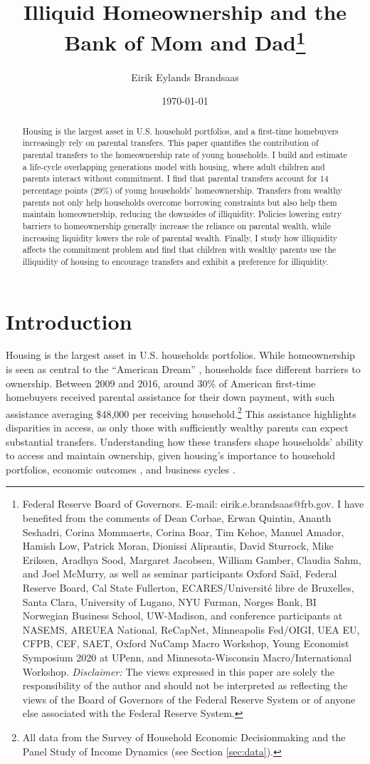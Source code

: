 \documentclass[12pt]{article}
\title{{\LARGE Illiquid Homeownership and  the \\  Bank of Mom and Dad}\thanks{Federal Reserve Board of Governors.  E-mail: eirik.e.brandsaas@frb.gov. I have benefited from the comments of Dean Corbae, Erwan Quintin, Ananth Seshadri, Corina Mommaerts,  Corina Boar, Tim Kehoe, Manuel Amador, Hamish Low, Patrick Moran, Dionissi Aliprantis, David Sturrock, Mike Eriksen, Aradhya Sood, Margaret Jacobsen, William Gamber, Claudia Sahm, and Joel McMurry, as well as seminar participants Oxford Sa{\"i}d, Federal Reserve Board, Cal State Fullerton, ECARES/Université libre de Bruxelles, Santa Clara, University of Lugano, NYU Furman, Norges Bank, BI Norwegian Business School, UW-Madison, and conference participants at NASEMS, AREUEA National, ReCapNet, Minneapolis Fed/OIGI, UEA EU, CFPB, CEF, SAET, Oxford NuCamp Macro Workshop, Young Economist Symposium 2020 at UPenn, and Minnesota-Wisconsin Macro/International Workshop. \textit{Disclaimer: }The views expressed in this paper are solely the responsibility of the author and should not be interpreted as reflecting the views of the Board of Governors of the Federal Reserve System or of anyone else associated with the Federal Reserve System.}}
\author{Eirik Eylands Brandsaas}
\date{{\today }}
\begin{document}
\maketitle
\begin{abstract}
{\begin{spacing}{1.2}
Housing is the largest asset in U.S. household portfolios, and a first-time homebuyers increasingly rely on parental transfers. This paper quantifies the contribution of parental transfers to the homeownership rate of young households. I build and estimate a life-cycle overlapping generations model with housing, where adult children and parents interact without commitment. I find that parental transfers account for 14 percentage points (29\%) of young households' homeownership. Transfers from wealthy parents not only help households overcome borrowing constraints but also help them maintain homeownership, reducing the downsides of illiquidity. Policies lowering entry barriers to homeownership generally increase the reliance on parental wealth, while increasing liquidity lowers the role of parental wealth. Finally, I study how illiquidity affects the commitment problem and find that children with wealthy parents use the illiquidity of housing to encourage transfers and exhibit a preference for illiquidity.
\end{spacing}}
\end{abstract}
\newpage
\onehalfspacing

\section{Introduction}
Housing is the largest asset in U.S. households portfolios. While homeownership is seen as central to the ``American Dream'' \citep{goodman2018homeownership}, households face different barriers to ownership. Between 2009 and 2016, around 30\% of American first-time homebuyers received parental assistance for their down payment, with such assistance averaging \$48,000 per receiving household.\footnote{All data from the Survey of Household Economic Decisionmaking and the Panel Study of Income Dynamics (see Section \ref{sec:data}).} This assistance highlights disparities in access, as only those with sufficiently wealthy parents can expect substantial transfers. Understanding how these transfers shape households' ability to access and maintain ownership, given  housing’s importance to household portfolios, economic outcomes \citep{sodini2023identifying}, and business cycles \citep{Kaplan2020,favilukis2017macroeconomic}.
\end{document}
